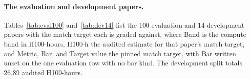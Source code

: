 \paragraph{The evaluation and development papers.} Tables~\ref{tab:eval100}
and~\ref{tab:dev14} list the 100 evaluation and 14 development papers with the
match target each is graded against, where Band is the compute band in
H100-hours, H100-h the audited estimate for that paper's match target, and Metric, Bar,
and Target value the pinned match target, with Bar written unset on the one
evaluation row with no bar kind. The
development split totals 26.89 audited H100-hours.


